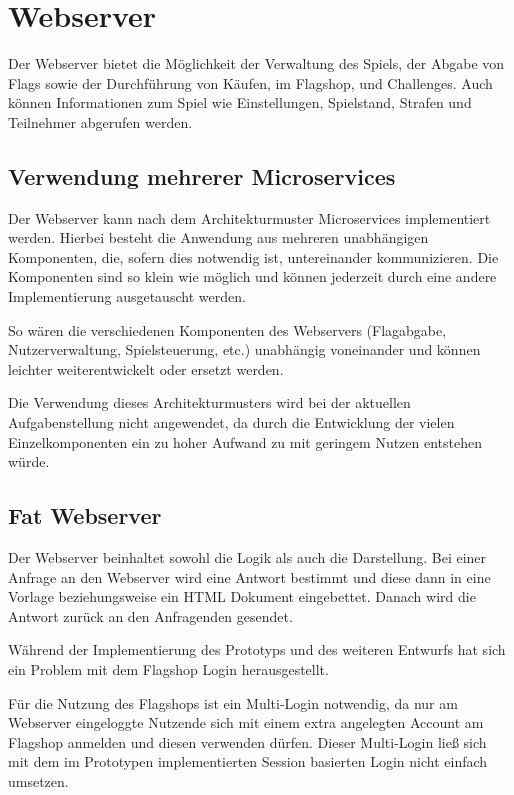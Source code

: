 \section{Webserver} \label{sec:Webserver}
Der Webserver bietet die Möglichkeit der Verwaltung des Spiels, der Abgabe von Flags sowie der Durchführung von Käufen, im Flagshop, und Challenges. Auch können Informationen zum Spiel wie Einstellungen, Spielstand, Strafen und Teilnehmer abgerufen werden.

\subsection{Verwendung mehrerer Microservices}
Der Webserver kann nach dem Architekturmuster Microservices implementiert werden. Hierbei besteht die Anwendung aus mehreren unabhängigen Komponenten, die, sofern dies notwendig ist, untereinander kommunizieren. Die Komponenten sind so klein wie möglich und können jederzeit durch eine andere Implementierung ausgetauscht werden. \cite{wolffMicroservicesGrundlagenFlexibler2015} 

So wären die verschiedenen Komponenten des Webservers (Flagabgabe, Nutzerverwaltung, Spielsteuerung, etc.) unabhängig voneinander und können leichter weiterentwickelt oder ersetzt werden.

Die Verwendung dieses Architekturmusters wird bei der aktuellen Aufgabenstellung nicht angewendet, da durch die Entwicklung der vielen Einzelkomponenten ein zu hoher Aufwand zu mit geringem Nutzen entstehen würde.

\subsection{Fat Webserver}
Der Webserver beinhaltet sowohl die Logik als auch die Darstellung. Bei einer Anfrage an den Webserver wird eine Antwort bestimmt und diese dann in eine Vorlage beziehungsweise ein HTML Dokument eingebettet. Danach wird die Antwort zurück an den Anfragenden gesendet.

Während der Implementierung des Prototyps und des weiteren Entwurfs hat sich ein Problem mit dem Flagshop Login herausgestellt.

Für die Nutzung des Flagshops ist ein Multi-Login notwendig, da nur am Webserver eingeloggte Nutzende sich mit einem extra angelegten Account am Flagshop anmelden und diesen verwenden dürfen. Dieser Multi-Login ließ sich mit dem im Prototypen implementierten Session basierten Login nicht einfach umsetzen. 

